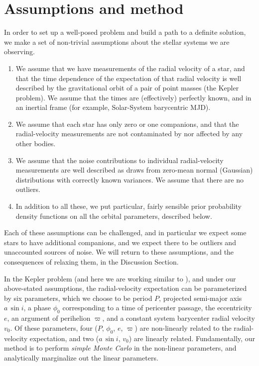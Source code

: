 \documentclass[12pt, preprint]{aastex}
\newcommand{\asini}{a\,\sin i}
\begin{document}
\section{Assumptions and method}

In order to set up a well-posed problem and build a path to a
definite solution, we make a set of non-trivial assumptions about the
stellar systems we are observing.
\begin{enumerate}
\item We assume that we have measurements of the radial velocity of a
  star, and that the time dependence of the expectation of that radial
  velocity is well described by the gravitational orbit of a pair of
  point masses (the Kepler problem). We assume that the times are
  (effectively) perfectly known, and in an inertial frame (for
  example, Solar-System barycentric MJD).
\item We assume that each star has only zero or one companions, and
  that the radial-velocity measurements are not contaminated by nor
  affected by any other bodies.
\item We assume that the noise contributions to individual
  radial-velocity measurements are well described as draws from
  zero-mean normal (Gaussian) distributions with correctly known
  variances. We assume that there are no outliers.
\item In addition to all these, we put particular, fairly sensible
  prior probability density functions on all the orbital parameters,
  described below.
\end{enumerate}
Each of these assumptions can be challenged, and in particular we
expect some stars to have additional companions, and we expect there
to be outliers and unaccounted sources of noise.
We will return to these assumptions, and the consequences of relaxing
them, in the Discussion Section.

In the Kepler problem (and here we are working similar to
\citealt{winn}), and under our above-stated assumptions, the
radial-velocity expectation can be parameterized by six parameters,
which we choose to be period $P$, projected semi-major axis $\asini$,
a phase $\phi_0$ corresponding to a time of pericenter passage, the
eccentricity $e$, an argument of perihelion $\varpi$, and a constant 
system barycenter radial velocity $v_0$.
Of these parameters, four ($P$, $\phi_0$, $e$, $\varpi$) are
non-linearly related to the radial-velocity expectation, and two
($\asini$, $v_0$) are linearly related.
Fundamentally, our method is to perform \emph{simple Monte Carlo} in
the non-linear parameters, and analytically marginalize out the linear
parameters.
\end{document}

